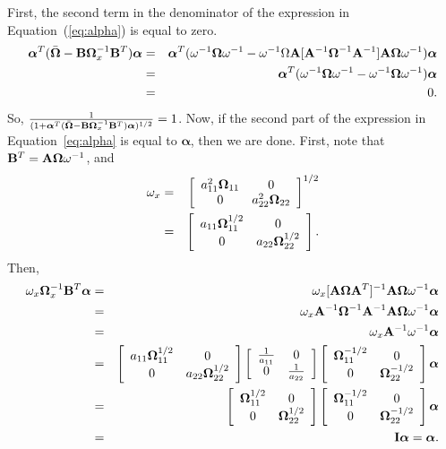 \documentclass[12pt]{article}
\def\balpha{{\boldsymbol \alpha}}
\def\balpha{{\boldsymbol \alpha}}
\def\ni{\noindent}
\def\bA{{\bf A}}
\def\bOmega{{\ensuremath\boldsymbol{\Omega}}}
\def\bOmega{{\ensuremath\boldsymbol{\Omega}}}
\begin{document}
\ni First,  the second term in the denominator of the expression in Equation~(\ref{eq:alpha}) is equal to zero.
\begin{eqnarray*}
\balpha^T(\bar\bOmega-\mathbf{B}\bOmega_x^{-1}\mathbf{B}^T)\balpha &=& \balpha^T(\omega^{-1}\bOmega\omega^{-1}-\omega^{-1}\Omega\bA[\bA^{-1}\bOmega^{-1}\bA^{-1}]\bA\bOmega\omega^{-1})\balpha\\
&=& \balpha^T(\omega^{-1}\bOmega\omega^{-1}-\omega^{-1}\bOmega\omega^{-1})\balpha\\
&=& 0.
\end{eqnarray*}
So, $\frac{1}{(1+\balpha^T(\bar\bOmega-\mathbf{B}\bOmega_x^{-1}\mathbf{B}^T)\balpha)^{1/2}} = 1$.
Now, if the second part of the expression in Equation~\ref{eq:alpha} is equal to $\balpha$, then we are done.  First, note that $\mathbf{B}^T = \bA\bOmega\omega^{-1}$, and 
\begin{eqnarray*}
\omega_x &=& \left[\begin{array}{cc}
   a_{11}^2\bOmega_{11} & 0\\
    0 & a_{22}^2\bOmega_{22} \end{array} \right]^{1/2}\\
    &=& \left[\begin{array}{cc}
   a_{11}\bOmega_{11}^{1/2} & 0\\
    0 & a_{22}\bOmega_{22}^{1/2} \end{array} \right].
\end{eqnarray*} 
Then, 
\begin{eqnarray*}
\omega_x \bOmega_x^{-1}\mathbf{B}^T\balpha &=& \omega_x [\bA\bOmega\bA^T]^{-1}\bA\bOmega\omega^{-1}\balpha\\
&=&  \omega_x \bA^{-1}\bOmega^{-1}\bA^{-1}\bA\bOmega\omega^{-1}\balpha\\
&=&  \omega_x \bA^{-1}\omega^{-1}\balpha\\
&=&  \left[\begin{array}{cc}
   a_{11}\bOmega_{11}^{1/2} & 0\\
    0 & a_{22}\bOmega_{22}^{1/2} \end{array} \right] \left[\begin{array}{cc}
   \frac{1}{a_{11}} & 0\\
    0 & \frac{1}{a_{22}} \end{array} \right]    \left[\begin{array}{cc}
   \bOmega_{11}^{-1/2} & 0\\
    0 &\bOmega_{22}^{-1/2} \end{array} \right]\balpha\\
&=&  \left[\begin{array}{cc}
  \bOmega_{11}^{1/2} & 0\\
    0 &\bOmega_{22}^{1/2} \end{array} \right]    \left[\begin{array}{cc}
   \bOmega_{11}^{-1/2} & 0\\
    0 &\bOmega_{22}^{-1/2} \end{array} \right]\balpha\\
&=& \mathbf{I}\balpha = \balpha    .
\end{eqnarray*}
\end{document}
